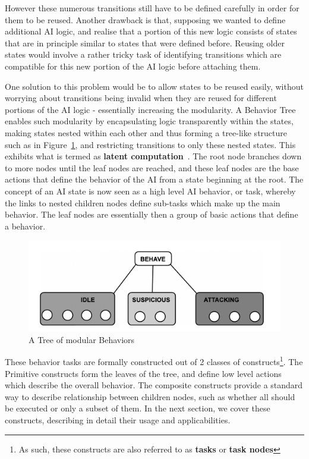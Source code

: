        However these numerous transitions still have to be defined carefully in order for them to be reused. Another drawback is that, supposing we wanted to define additional AI logic, and realise that a portion of this new logic consists of states that are in principle similar to states that were defined before. Reusing older states would involve a rather tricky task of identifying transitions which are compatible for this new portion of the AI logic before attaching them.
        
       One solution to this problem would be to allow states to be reused easily, without worrying about transitions being invalid when they are reused for different portions of the AI logic - essentially increasing the modularity. A Behavior Tree enables such modularity by encapsulating logic transparently within the states, making states nested within each other and thus forming a tree-like structure such as in Figure~\ref{img:btgen}, and restricting transitions to only these nested states. This exhibits what is termed as \textbf{latent computation}~\cite{btnextgenpart1}. The root node branches down to more nodes until the leaf nodes are reached, and these leaf nodes are the base actions that define the behavior of the AI from a state beginning at the root. The concept of an AI state is now seen as a high level AI behavior, or task, whereby the links to nested children nodes define sub-tasks which make up the main behavior. The leaf nodes are essentially then a group of basic actions that define a behavior.
        
        \begin{figure}[htp]
            \begin{center}
            \includegraphics[scale=0.4]{images/btgen.png}
            \caption{A Tree of modular Behaviors~\cite{understandingbts}}
            \label{img:btgen}
            \end{center} 
        \end{figure}
        
        These behavior tasks are formally constructed out of 2 classes of constructs\footnote{As such, these constructs are also referred to as \textbf{tasks} or \textbf{task nodes}}. The Primitive constructs form the leaves of the tree, and define low level actions which describe the overall behavior. The composite constructs provide a standard way to describe relationship between children nodes, such as whether all should be executed or only a subset of them. In the next section, we cover these constructs, describing in detail their usage and applicabilities.
        
